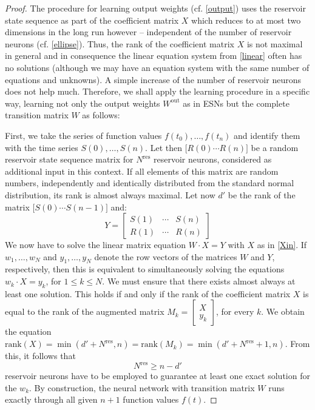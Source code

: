 \documentclass[twoside,11pt]{article}
\theoremstyle{definition}
\begin{document}
\begin{proof}
The procedure for learning output weights (cf. \cref{output}) uses the
reservoir state sequence as part of the coefficient matrix $X$ which reduces to
at most two dimensions in the long run however -- independent of the number of reservoir neurons
(cf. \cref{ellipse}). Thus, the rank of the coefficient matrix $X$ is
not maximal in general and in consequence the linear equation system from
\cref{linear} often has no solutions (although we may have an equation system
with the same number of equations and unknowns). A simple increase of the number
of reservoir neurons does not help much. Therefore, we shall apply the learning
procedure in a specific way, learning not only the output weights
$W^\mathrm{out}$ as in ESNs but the complete transition matrix $W$ as follows:

First, we take the series of function values $f(t_0),\dots,f(t_n)$ and identify
them with the time series $S(0),\dots,S(n)$. Let then $\big[R(0) \cdots R(n)
\big]$ be a random reservoir state sequence matrix for $N^\mathrm{res}$
reservoir neurons, considered as additional input in this context. If all
elements of this matrix are random numbers, independently and identically distributed from
the standard normal distribution, its rank is almost always maximal. Let now
$d'$ be the rank of the matrix $\big[ S(0) \cdots S(n-1) \big]$ and:
\[ Y = \left[ \begin{array}{ccc}
	S(1) & \cdots & S(n)\\
	R(1) & \cdots & R(n)
\end{array} \right] \]
We now have to solve the linear matrix equation $W \cdot X = Y$ with $X$ as
in \cref{Xin}. If $w_1,\dots,w_N$ and $y_1,\dots,y_N$ denote the row
vectors of the matrices $W$ and $Y$, respectively, then this is equivalent to
simultaneously solving the equations $w_k \cdot X = y_k$, for $1 \le k \le N$.
We must ensure that there exists almost always at least one solution. This holds
if and only if the rank of the coefficient matrix $X$ is equal to the rank of
the augmented matrix $M_k = \left[ \begin{array}{c} X\\ y_k \end{array}
\right]$, for every $k$. We obtain the equation $\mathrm{rank}(X) =
\min(d'+N^\mathrm{res},n) = \mathrm{rank}(M_k) = \min(d'+N^\mathrm{res}+1,n)$.
From this, it follows that
\begin{equation}\label{ineq}
	N^\mathrm{res} \ge n-d'
\end{equation}
reservoir neurons have to be employed to guarantee at least one exact solution
for the $w_k$. By construction, the neural network with transition matrix $W$
runs exactly through all given $n+1$ function values $f(t)$.
\end{proof}
\end{document}
